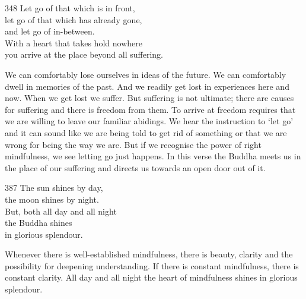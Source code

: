 

\begin{dhpVerse}{348}
\label{dhp-348}
Let go of that which is in front,\\
let go of that which has already gone,\\
and let go of in-between.\\
With a heart that takes hold nowhere\\
you arrive at the place beyond all suffering.
\end{dhpVerse}

\begin{dhpRefl}

We can comfortably lose ourselves in ideas of the future. We can
comfortably dwell in memories of the past. And we readily get lost in
experiences here and now. When we get lost we suffer. But suffering
is not ultimate; there are causes for suffering and there is freedom
from them. To arrive at freedom requires that we are willing to leave
our familiar abidings. We hear the instruction to `let go' and it can
sound like we are being told to get rid of something or that we are
wrong for being the way we are. But if we recognise the power of
right mindfulness, we see letting go just happens. In this verse the
Buddha meets us in the place of our suffering and directs us towards
an open door out of it.

\end{dhpRefl}


\begin{dhpVerse}{387}
\label{dhp-387}
The sun shines by day,\\
the moon shines by night.\\
But, both all day and all night\\
the Buddha shines\\
in glorious splendour.
\end{dhpVerse}

\begin{dhpRefl}

Whenever there is well-established mindfulness, there is beauty,
clarity and the possibility for deepening understanding. If there is
constant mindfulness, there is constant clarity. All day and all
night the heart of mindfulness shines in glorious splendour.

\end{dhpRefl}


